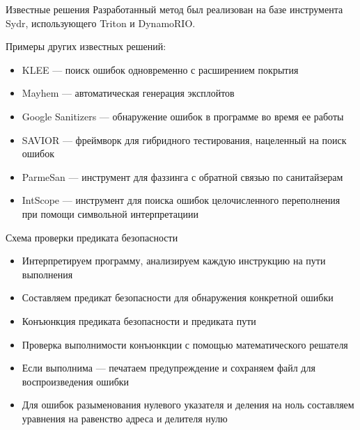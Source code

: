 \documentclass[10pt]{beamer}
\begin{document}
\begin{frame}{Известные решения}
Разработанный метод был реализован на базе инструмента Sydr, использующего
Triton и DynamoRIO.

Примеры других известных решений:
\begin{itemize}
    \item KLEE --- поиск ошибок одновременно с расширением покрытия
    \item Mayhem --- автоматическая генерация эксплойтов
    \item Google Sanitizers --- обнаружение ошибок в программе
        во время ее работы
    \item SAVIOR --- фреймворк для гибридного тестирования, нацеленный на поиск
        ошибок
    \item ParmeSan --- инструмент для фаззинга с обратной связью по санитайзерам
    \item IntScope --- инструмент для поиска ошибок целочисленного переполнения
        при помощи символьной интерпретациии
\end{itemize}
\end{frame}

\begin{frame}{Схема проверки предиката безопасности}
\begin{itemize}
    \item Интерпретируем программу, анализируем каждую инструкцию на пути
        выполнения
    \item Составляем предикат безопасности для обнаружения конкретной ошибки
    \item Конъюнкция предиката безопасности и предиката пути
    \item Проверка выполнимости конъюнкции с помощью математического решателя
    \item Если выполнима --- печатаем предупреждение и сохраняем файл
        для воспроизведения ошибки
    \item Для ошибок разыменования нулевого указателя и деления на ноль
        составляем уравнения на равенство адреса и делителя нулю
\end{itemize}
\end{frame}

\end{document}
